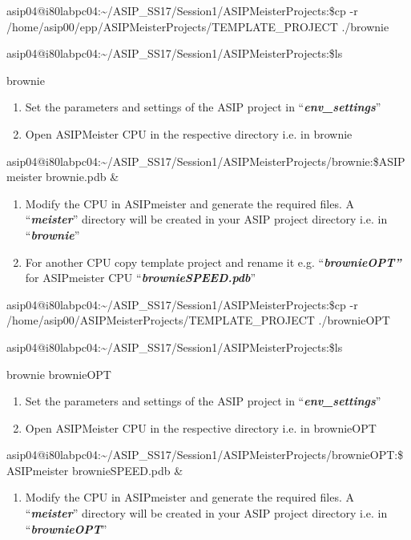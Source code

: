 \documentclass[
]{article}
\begin{document}
asip04@i80labpc04:\textasciitilde/ASIP\_SS17/Session1/ASIPMeisterProjects:\$cp
-r /home/asip00/epp/ASIPMeisterProjects/TEMPLATE\_PROJECT ./brownie

asip04@i80labpc04:\textasciitilde/ASIP\_SS17/Session1/ASIPMeisterProjects:\$ls

brownie

\begin{enumerate}
\def\labelenumi{\arabic{enumi}.}
\setcounter{enumi}{6}
\item
  Set the parameters and settings of the ASIP project in
  ``\emph{\textbf{env\_settings}}''
\item
  Open ASIPMeister CPU in the respective directory i.e. in brownie
\end{enumerate}

asip04@i80labpc04:\textasciitilde/ASIP\_SS17/Session1/ASIPMeisterProjects/brownie:\$ASIPmeister
brownie.pdb \&

\begin{enumerate}
\def\labelenumi{\arabic{enumi}.}
\setcounter{enumi}{8}
\item
  Modify the CPU in ASIPmeister and generate the required files. A
  ``\emph{\textbf{meister}}'' directory will be created in your ASIP
  project directory i.e. in ``\emph{\textbf{brownie}}''
\item
  For another CPU copy template project and rename it e.g.
  ``\emph{\textbf{brownieOPT''}} for ASIPmeister CPU
  ``\emph{\textbf{brownieSPEED.pdb}}''
\end{enumerate}

asip04@i80labpc04:\textasciitilde/ASIP\_SS17/Session1/ASIPMeisterProjects:\$cp
-r /home/asip00/ASIPMeisterProjects/TEMPLATE\_PROJECT ./brownieOPT

asip04@i80labpc04:\textasciitilde/ASIP\_SS17/Session1/ASIPMeisterProjects:\$ls

brownie brownieOPT

\begin{enumerate}
\def\labelenumi{\arabic{enumi}.}
\setcounter{enumi}{10}
\item
  Set the parameters and settings of the ASIP project in
  ``\emph{\textbf{env\_settings}}''
\item
  Open ASIPMeister CPU in the respective directory i.e. in brownieOPT
\end{enumerate}

asip04@i80labpc04:\textasciitilde/ASIP\_SS17/Session1/ASIPMeisterProjects/brownieOPT:\$ASIPmeister
brownieSPEED.pdb \&

\begin{enumerate}
\def\labelenumi{\arabic{enumi}.}
\setcounter{enumi}{12}
\item
  Modify the CPU in ASIPmeister and generate the required files. A
  ``\emph{\textbf{meister}}'' directory will be created in your ASIP
  project directory i.e. in ``\emph{\textbf{brownieOPT}}''
\end{enumerate}
\end{document}
